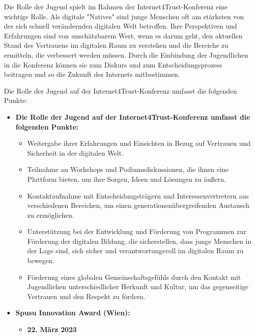 Die Rolle der Jugend spielt im Rahmen der Internet4Trust-Konferenz eine wichtige Rolle. Als digitale "Natives" sind junge Menschen oft am stärksten von der sich schnell verändernden digitalen Welt betroffen. Ihre Perspektiven und Erfahrungen sind von unschätzbarem Wert, wenn es darum geht, den aktuellen Stand des Vertrauens im digitalen Raum zu verstehen und die Bereiche zu ermitteln, die verbessert werden müssen. Durch die Einbindung der Jugendlichen in die Konferenz können sie zum Diskurs und zum Entscheidungsprozess beitragen und so die Zukunft des Internets mitbestimmen.


Die Rolle der Jugend auf der Internet4Trust-Konferenz umfasst die folgenden Punkte:

\begin{itemize}
    \item \textbf{Die Rolle der Jugend auf der Internet4Trust-Konferenz umfasst die folgenden Punkte:}
    \begin{itemize}
        \item {Weitergabe ihrer Erfahrungen und Einsichten in Bezug auf Vertrauen und Sicherheit in der digitalen Welt.}
        \item {Teilnahme an Workshops und Podiumsdiskussionen, die ihnen eine Plattform bieten, um ihre Sorgen, Ideen und Lösungen zu äußern.}
        \item {Kontaktaufnahme mit Entscheidungsträgern und Interessenvertretern aus verschiedenen Bereichen, um einen generationenübergreifenden Austausch zu ermöglichen.}
        \item {Unterstützung bei der Entwicklung und Förderung von Programmen zur Förderung der digitalen Bildung, die sicherstellen, dass junge Menschen in der Lage sind, sich sicher und verantwortungsvoll im digitalen Raum zu bewegen.}
        \item {Förderung eines globalen Gemeinschaftsgefühls durch den Kontakt mit Jugendlichen unterschiedlicher Herkunft und Kultur, um das gegenseitige Vertrauen und den Respekt zu fördern.}
    \end{itemize}
\end{itemize}


\begin{itemize}
    \item \textbf{Spusu Innovation Award (Wien):}
    \begin{itemize}
        \item \textbf{22. März 2023}
    \end{itemize}
\end{itemize}

